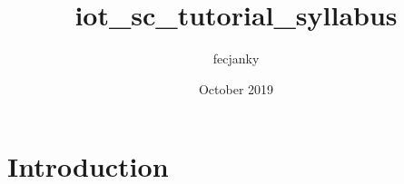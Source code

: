 \documentclass{article}
\title{iot_sc_tutorial_syllabus}
\author{fecjanky }
\date{October 2019}
\begin{document}
\maketitle

\section{Introduction}
\end{document}
